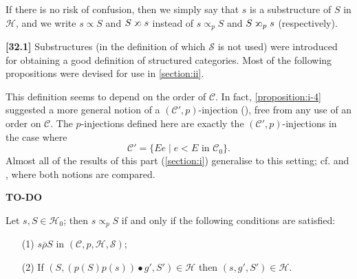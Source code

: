 \documentclass[a4paper,fleqn]{article}
\theoremstyle{plain}
\newenvironment{proposition}[1]
  {\renewcommand\theinnerproposition{#1}\innerproposition}
  {\endinnerproposition}
\theoremstyle{definition}
\newenvironment{longcomm}[1]
  {\noindent\textbf{[#1]}\rmfamily}
  {}
\newcommand{\todo}{{\color{purple}\textbf{TO-DO }}}
\newcommand{\CC}{\mathcal{C}}
\newcommand{\HH}{\mathcal{H}}
\renewcommand{\SS}{\mathcal{S}}
\newcommand{\relrhobar}{\mathrel{\overline{\rho}}}
\newcommand{\subs}{\mathrel{\propto}}
\newcommand{\sups}{\mathrel{\reflectbox{$\propto$}}}
\begin{document}
If there is no risk of confusion, then we simply say that $s$ is a substructure of $S$ in $\HH$, and we write $s\subs S$ and $S\sups s$ instead of $s\subs_p S$ and $S\sups_p s$ (respectively).

\begin{longcomm}{32.1}
  Substructures (in the definition of which $\SS$ is not used) were introduced for obtaining a good definition of structured categories.
  Most of the following propositions were devised for use in \cref{section:ii}.

  This definition seems to depend on the order of $\CC$.
  In fact, \cref{proposition:i-4} suggested a more general notion of a $(\CC',p)$-injection (\cite{coll69,coll66}), free from any use of an order on $\CC$.
  The $p$-injections defined here are exactly the $(\CC',p)$-injections in the case where
  \[
    \CC'
    = \{Ee \mid e<E\text{ in }\CC_0\}.
  \]
  Almost all of the results of this part (\cref{section:i}) generalise to this setting; cf. \cite{coll66} and \cite{coll69}, where both notions are compared.

  \todo
\end{longcomm}

\begin{proposition}{4}
\label{proposition:i-4}
  Let $s,S\in\HH_0$;
  then $s\subs_p S$ if and only if the following conditions are satisfied:
  \begin{enumerate}
    \item[\normalfont(1\textquotesingle)]
      $s\relrhobar S$ in $(\CC,p,\HH,\SS)$;
    \item[\normalfont(2\textquotesingle)]
      If $(S,(p(S)p(s))\bullet g',S')\in\HH$ then $(s,g',S')\in\HH$.
  \end{enumerate}
\end{proposition}
\end{document}
